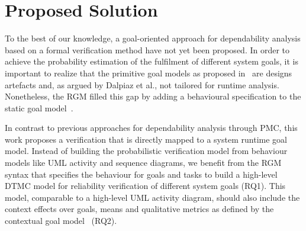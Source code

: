 \bigskip

\setlength{\fboxsep}{10pt}
\noindent{}\bigskip


\section{Proposed Solution} 

%




To the best of our knowledge, a goal-oriented approach for dependability analysis based on a formal verification method have not yet been proposed. In order to achieve the probability estimation of the fulfilment of different system goals, it is important to realize that the primitive goal models as proposed in~\cite{Dardenne1993, Yu1996, Bresciani:2004} are designs artefacts and, as argued by Dalpiaz et al., not tailored for runtime analysis. Nonetheless, the RGM filled this gap by adding a behavioural specification to the static goal model~\cite{Dalpiaz:2013}.

In contrast to previous approaches for dependability analysis through PMC, this work proposes a verification that is directly mapped to a system runtime goal model. Instead of building the probabilistic verification model from behaviour models like UML activity and sequence diagrams, we benefit from the RGM syntax that specifies the behaviour for goals and tasks to build a high-level DTMC model for reliability verification of different system goals (RQ1). This model, comparable to a high-level UML activity diagram, should also include the context effects over goals, means and qualitative metrics as defined by the contextual goal model~\cite{Ali:2010} (RQ2).

